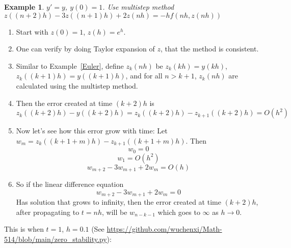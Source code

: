 \documentclass[20pt]{article} %
\theoremstyle{break}
\newtheorem{exa}[definition]{Example}
\begin{document}
\begin{exa}$y'=y$, $y(0)=1$. Use multistep method $z((n+2)h)-3z((n+1)h)+2z(nh)=-hf(nh, z(nh))$\end{exa}
\begin{enumerate}
\item Start with $z(0)=1$, $z(h)=e^h$.
\item One can verify by doing Taylor expansion of $z$, that the method is consistent.
\item Similar to Example~\ref{Euler}, define $z_k(nh)$ be $z_k(kh)=y(kh)$, $z_k((k+1)h)=y((k+1)h)$, and for all $n>k+1$, $z_k(nh)$ are calculated using the multistep method.
\item Then the error created at time $(k+2)h$ is
  \[z_k((k+2)h)-y((k+2)h)=z_k((k+2)h)-z_{k+1}((k+2)h)=O(h^2)\]

\newpage
\item Now let's see how this error grow with time: Let $w_m=z_k((k+1+m)h)-z_{k+1}((k+1+m)h)$. Then
  \[w_0=0\]
  \[w_1=O(h^2)\]
  \[w_{m+2}-3w_{m+1}+2w_m=O(h)\]
\item So if the linear difference equation
  \[w_{m+2}-3w_{m+1}+2w_m=0\]
  Has solution that grows to infinity, then the error created at time $(k+2)h$, after propagating to $t=nh$, will be $w_{n-k-1}$ which goes to $\infty$ as $h\rightarrow 0$.
\end{enumerate}

This is when $t=1$, $h=0.1$ (See \url{https://github.com/wuchenxi/Math-514/blob/main/zero_stability.py}):\\
\end{document}
